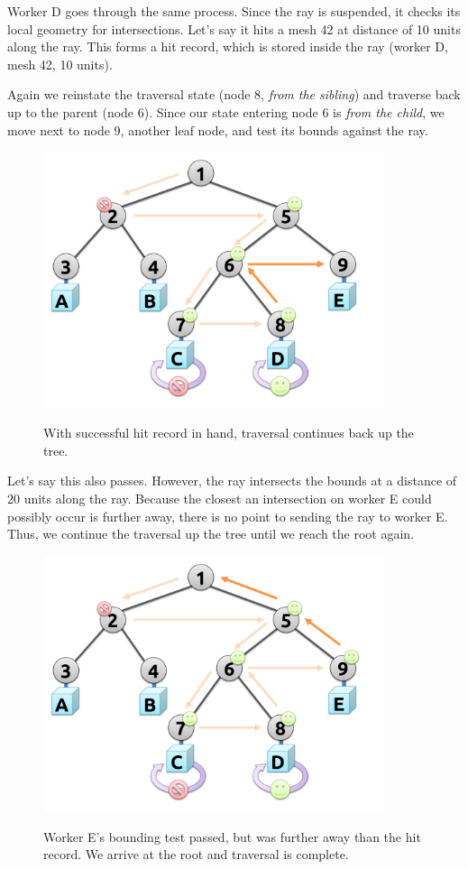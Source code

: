 \documentclass[12pt]{ucthesis}
\newcommand{\captionfonts}{\small\bf\ssp}
\begin{document}
Worker D goes through the same process. Since the ray is suspended, it checks
its local geometry for intersections. Let's say it hits a mesh 42 at distance
of 10 units along the ray. This forms a hit record, which is stored inside the
ray (worker D, mesh 42, 10 units).

Again we reinstate the traversal state (node 8, \emph{from the sibling}) and
traverse back up to the parent (node 6). Since our state entering node 6 is
\emph{from the child}, we move next to node 9, another leaf node, and test
its bounds against the ray.

\begin{figure}[H]
    \centering
    \includegraphics[width=100mm]{figures/traversal6.pdf}
    \captionfonts
    \caption{With successful hit record in hand, traversal continues back up the tree.}
    \label{fig:traversal6}
\end{figure}

Let's say this also passes. However, the ray intersects the bounds at a distance
of 20 units along the ray. Because the closest an intersection on worker E
could possibly occur is further away, there is no point to sending the ray to
worker E. Thus, we continue the traversal up the tree until we reach the root
again.

\begin{figure}[H]
    \centering
    \includegraphics[width=100mm]{figures/traversal7.pdf}
    \captionfonts
    \caption{Worker E's bounding test passed, but was further away than the hit record. We arrive at the root and traversal is complete.}
    \label{fig:traversal7}
\end{figure}
\end{document}
